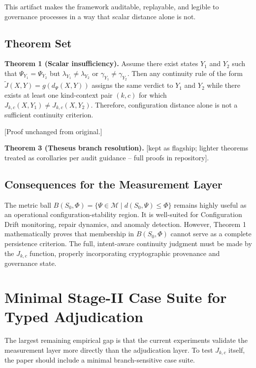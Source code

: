 \documentclass[11pt,a4paper]{article}
\begin{document}
This artifact makes the framework auditable, replayable, and legible to governance processes in a way that scalar distance alone is not.

\subsection{Theorem Set}
\noindent \textbf{Theorem 1 (Scalar insufficiency).} Assume there exist states \(Y_1\) and \(Y_2\) such that \(\Psi_{Y_1} = \Psi_{Y_2}\) but \(\lambda_{Y_1} \neq \lambda_{Y_2}\) or \(\gamma_{Y_1} \neq \gamma_{Y_2}\). Then any continuity rule of the form \(\tilde{J}(X, Y) = g(d_\Psi(X, Y))\) assigns the same verdict to \(Y_1\) and \(Y_2\) while there exists at least one kind-context pair \((k, c)\) for which \(J_{k,c}(X, Y_1) \neq J_{k,c}(X, Y_2)\). Therefore, configuration distance alone is not a sufficient continuity criterion.

[Proof unchanged from original.]

\noindent \textbf{Theorem 3 (Theseus branch resolution).} [kept as flagship; lighter theorems treated as corollaries per audit guidance -- full proofs in repository].

\subsection{Consequences for the Measurement Layer}
The metric ball \(B(S_0, \Phi) = \{\Psi \in \mathcal{M} \mid d(S_0, \Psi) \le \Phi\}\) remains highly useful as an operational configuration-stability region. It is well-suited for Configuration Drift monitoring, repair dynamics, and anomaly detection. However, Theorem 1 mathematically proves that membership in \(B(S_0, \Phi)\) cannot serve as a complete persistence criterion. The full, intent-aware continuity judgment must be made by the \(J_{k,c}\) function, properly incorporating cryptographic provenance and governance state.

\section{Minimal Stage-II Case Suite for Typed Adjudication}
The largest remaining empirical gap is that the current experiments validate the measurement layer more directly than the adjudication layer. To test \(J_{k,c}\) itself, the paper should include a minimal branch-sensitive case suite.
\end{document}

